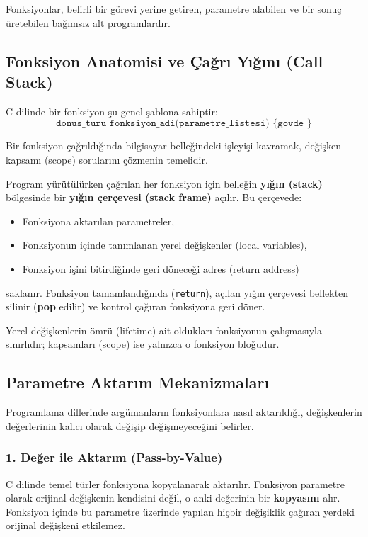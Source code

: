 Fonksiyonlar, belirli bir görevi yerine getiren, parametre alabilen ve bir sonuç üretebilen bağımsız alt programlardır.

\subsection{Fonksiyon Anatomisi ve Çağrı Yığını (Call Stack)}

C dilinde bir fonksiyon şu genel şablona sahiptir:
\[
\texttt{donus\_turu fonksiyon\_adi(parametre\_listesi) \{ govde \}}
\]

Bir fonksiyon çağrıldığında bilgisayar belleğindeki işleyişi kavramak, değişken kapsamı (scope) sorularını çözmenin temelidir.

\begin{definition}
Program yürütülürken çağrılan her fonksiyon için belleğin \textbf{yığın (stack)} bölgesinde bir \textbf{yığın çerçevesi (stack frame)} açılır. Bu çerçevede:
\begin{itemize}
    \item Fonksiyona aktarılan parametreler,
    \item Fonksiyonun içinde tanımlanan yerel değişkenler (local variables),
    \item Fonksiyon işini bitirdiğinde geri döneceği adres (return address)
\end{itemize}
saklanır. Fonksiyon tamamlandığında (\texttt{return}), açılan yığın çerçevesi bellekten silinir (\textbf{pop} edilir) ve kontrol çağıran fonksiyona geri döner.
\end{definition}

Yerel değişkenlerin ömrü (lifetime) ait oldukları fonksiyonun çalışmasıyla sınırlıdır; kapsamları (scope) ise yalnızca o fonksiyon bloğudur.

\subsection{Parametre Aktarım Mekanizmaları}

Programlama dillerinde argümanların fonksiyonlara nasıl aktarıldığı, değişkenlerin değerlerinin kalıcı olarak değişip değişmeyeceğini belirler.

\subsubsection{1. Değer ile Aktarım (Pass-by-Value)}

C dilinde temel türler fonksiyona kopyalanarak aktarılır. Fonksiyon parametre olarak orijinal değişkenin kendisini değil, o anki değerinin bir \textbf{kopyasını} alır. Fonksiyon içinde bu parametre üzerinde yapılan hiçbir değişiklik çağıran yerdeki orijinal değişkeni etkilemez.

